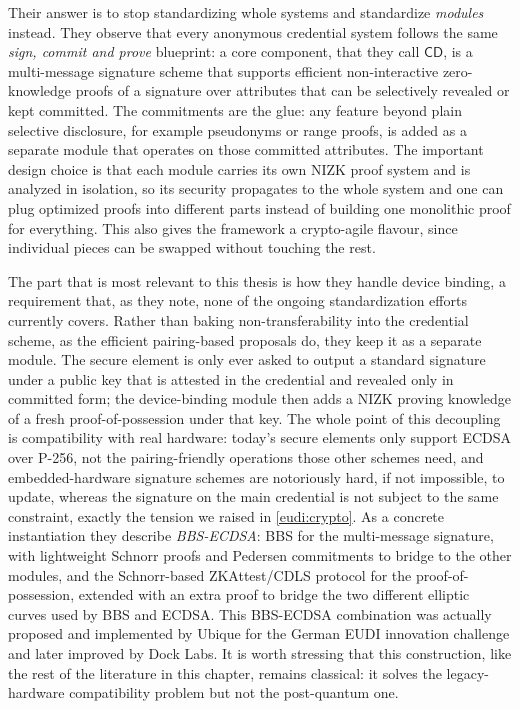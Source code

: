 \documentclass{article}
\begin{document}
Their answer is to stop standardizing whole systems and standardize \emph{modules} instead. They observe that every
anonymous credential system follows the same \emph{sign, commit and prove} blueprint: a core component, that they call
$\mathsf{CD}$, is a multi-message signature scheme that supports efficient non-interactive zero-knowledge proofs of a
signature over attributes that can be selectively revealed or kept committed. The commitments are the glue: any feature
beyond plain selective disclosure, for example pseudonyms or range proofs, is added as a separate module that operates
on those committed attributes. The important design choice is that each module carries its own NIZK proof system and is
analyzed in isolation, so its security propagates to the whole system and one can plug optimized proofs into different
parts instead of building one monolithic proof for everything. This also gives the framework a crypto-agile flavour,
since individual pieces can be swapped without touching the rest.

The part that is most relevant to this thesis is how they handle device binding, a requirement that, as they note, none
of the ongoing standardization efforts currently covers. Rather than baking non-transferability into the credential
scheme, as the efficient pairing-based proposals do, they keep it as a separate module. The secure element is only ever
asked to output a standard signature under a public key that is attested in the credential and revealed only in
committed form; the device-binding module then adds a NIZK proving knowledge of a fresh proof-of-possession under that
key. The whole point of this decoupling is compatibility with real hardware: today's secure elements only support ECDSA
over P-256, not the pairing-friendly operations those other schemes need, and embedded-hardware signature schemes are
notoriously hard, if not impossible, to update, whereas the signature on the main credential is not subject to the same
constraint, exactly the tension we raised in \cref{eudi:crypto}. As a concrete instantiation they describe
\emph{BBS-ECDSA}: BBS for the multi-message signature, with lightweight Schnorr proofs and Pedersen commitments to
bridge to the other modules, and the Schnorr-based ZKAttest/CDLS protocol for the proof-of-possession, extended with an
extra proof to bridge the two different elliptic curves used by BBS and ECDSA. This BBS-ECDSA combination was actually
proposed and implemented by Ubique for the German EUDI innovation challenge and later improved by Dock Labs. It is worth
stressing that this construction, like the rest of the literature in this chapter, remains classical: it solves the
legacy-hardware compatibility problem but not the post-quantum one.
\end{document}
